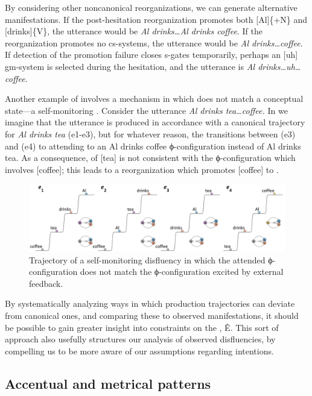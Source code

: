   By considering other noncanonical reorganizations, we can generate alternative manifestations. If the post-hesitation reorganization promotes both [Al]\{+N\} and [drinks]\{V\}, the utterance would be \textit{Al drinks…Al drinks coffee}. If the reorganization promotes no cs-systems, the utterance would be \textit{Al drinks…coffee}. If detection of the promotion failure closes s-gates temporarily, perhaps an [uh] gm-system is selected during the hesitation, and the utterance is \textit{Al drinks…uh…coffee}.

  Another example of  involves a mechanism in which  does not match a conceptual state—a self-monitoring . Consider the utterance \textit{Al drinks tea…coffee.} In {} we imagine that the utterance is produced in accordance with a canonical trajectory for \textit{Al drinks tea} (e1-e3), but for whatever reason, the  transitions between (e3) and (e4) to attending to an {\textbar}Al drinks coffee{\textbar} ϕ-configuration instead of {\textbar}Al drinks tea{\textbar}. As a consequence,  of [tea] is not consistent with the ϕ-configuration which involves [coffee]; this leads to a reorganization which promotes [coffee] to .

  
\begin{figure}
\includegraphics[width=\textwidth]{figures/Tilsen-img62.png}
\caption{Trajectory of a self-monitoring disfluency in which the attended ϕ-configuration does not match the ϕ-configuration excited by external feedback.}
\label{fig:4:12}
\end{figure}
 

  By systematically analyzing ways in which production trajectories can deviate from canonical ones, and comparing these to observed manifestations, it should be possible to gain greater insight into constraints on the , Ê. This sort of approach also usefully structures our analysis of observed disfluencies, by compelling us to be more aware of our assumptions regarding  intentions.

\subsection{Accentual and metrical patterns}

